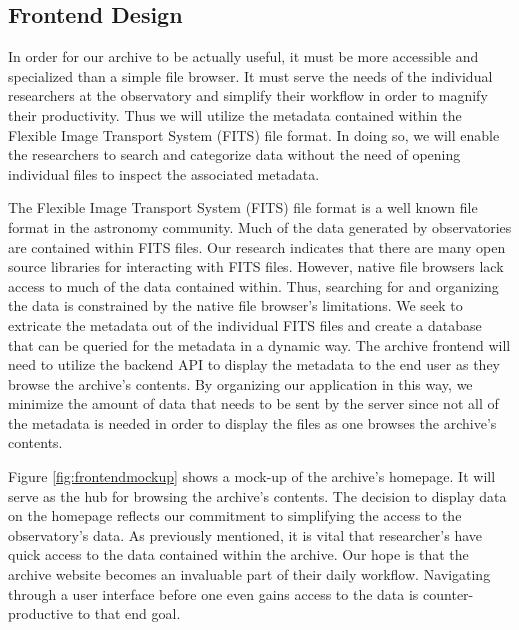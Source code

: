 \documentclass[12pt]{report}
\begin{document}
\begin{enumerate}
\subsection*{Frontend Design}

In order for our archive to be actually useful, it must be more accessible and specialized than a simple file browser. It must serve the needs of the individual researchers at the observatory and simplify their workflow in order to magnify their productivity. Thus we will utilize the metadata contained within the Flexible Image Transport System (FITS) file format. In doing so, we will enable the researchers to search and categorize data without the need of opening individual files to inspect the associated metadata.

The Flexible Image Transport System (FITS) file format is a well known file format in the astronomy community. Much of the data generated by observatories are contained within FITS files. Our research indicates that there are many open source libraries for interacting with FITS files. However, native file browsers lack access to much of the data contained within. Thus, searching for and organizing the data is constrained by the native file browser's limitations. We seek to extricate the metadata out of the individual FITS files and create a database that can be queried for the metadata in a dynamic way. The archive frontend will need to utilize the backend API to display the metadata to the end user as they browse the archive's contents. By organizing our application in this way, we minimize the amount of data that needs to be sent by the server since not all of the metadata is needed in order to display the files as one browses the archive's contents.

Figure \ref{fig:frontendmockup} shows a mock-up of the archive's homepage. It will serve as the hub for browsing the archive's contents. The decision to display data on the homepage reflects our commitment to simplifying the access to the observatory's data. As previously mentioned, it is vital that researcher's have quick access to the data contained within the archive. Our hope is that the archive website becomes an invaluable part of their daily workflow. Navigating through a user interface before one even gains access to the data is counter-productive to that end goal.


\end{enumerate}
\end{document}
